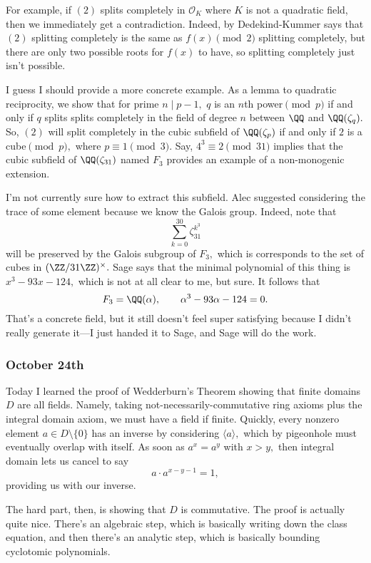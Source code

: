 For example, if $(2)$ splits completely in $\mathcal O_K$ where $K$ is not a quadratic field, then we immediately get a contradiction. Indeed, by Dedekind-Kummer says that $(2)$ splitting completely is the same as $f(x)\pmod2$ splitting completely, but there are only two possible roots for $f(x)$ to have, so splitting completely just isn't possible.

I guess I should provide a more concrete example. As a lemma to quadratic reciprocity, we show that for prime $n\mid p-1,$ $q$ is an $n$th power$\pmod p$ if and only if $q$ splits splits completely in the field of degree $n$ between $\QQ$ and $\QQ(\zeta_q).$ So, $(2)$ will split completely in the cubic subfield of $\QQ(\zeta_p)$ if and only if $2$ is a cube$\pmod p,$ where $p\equiv1\pmod3.$ Say, $4^3\equiv2\pmod{31}$ implies that the cubic subfield of $\QQ(\zeta_{31})$ named $F_3$ provides an example of a non-monogenic extension.

I'm not currently sure how to extract this subfield. Alec suggested considering the trace of some element because we know the Galois group. Indeed, note that
\[\sum_{k=0}^{30}\zeta_{31}^{k^3}\]
will be preserved by the Galois subgroup of $F_3,$ which is corresponds to the set of cubes in $(\ZZ/31\ZZ)^\times.$ Sage says that the minimal polynomial of this thing is $x^3 - 93x - 124,$ which is not at all clear to me, but sure. It follows that
\[F_3=\QQ(\alpha),\qquad\alpha^3-93\alpha-124=0.\]
That's a concrete field, but it still doesn't feel super satisfying because I didn't really generate it---I just handed it to Sage, and Sage will do the work.

\subsubsection{October 24th}
Today I learned the proof of Wedderburn's Theorem showing that finite domains $D$ are all fields. Namely, taking not-necessarily-commutative ring axioms plus the integral domain axiom, we must have a field if finite. Quickly, every nonzero element $a\in D\setminus\{0\}$ has an inverse by considering $\langle a\rangle,$ which by pigeonhole must eventually overlap with itself. As soon as $a^x=a^y$ with $x>y,$ then integral domain lets us cancel to say
\[a\cdot a^{x-y-1}=1,\]
providing us with our inverse.

The hard part, then, is showing that $D$ is commutative. The proof is actually quite nice. There's an algebraic step, which is basically writing down the class equation, and then there's an analytic step, which is basically bounding cyclotomic polynomials.

